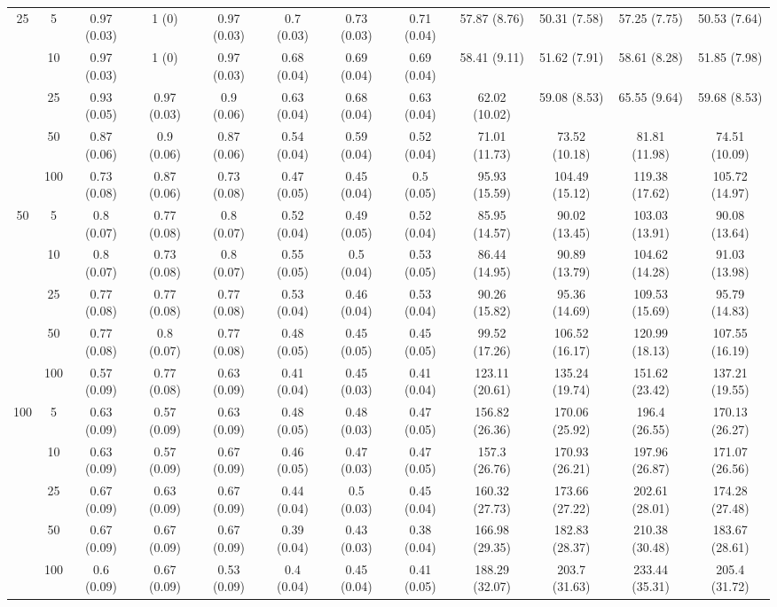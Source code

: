 \documentclass[10pt]{article}
\theoremstyle{definition}
\begin{document}
\begin{table}[H]
\begin{center}
{\begin{tabular}{cc|ccc|ccc|cccc|}
 \multirow{5}{*}{25} & 5  & 0.97 (0.03) & 1 (0) & 0.97 (0.03) & 0.7 (0.03) & 0.73 (0.03) & 0.71 (0.04) & 57.87 (8.76) & 50.31 (7.58) & 57.25 (7.75) & 50.53 (7.64) \\ 
  & 10  & 0.97 (0.03) & 1 (0) & 0.97 (0.03) & 0.68 (0.04) & 0.69 (0.04) & 0.69 (0.04) & 58.41 (9.11) & 51.62 (7.91) & 58.61 (8.28) & 51.85 (7.98) \\ 
  & 25  & 0.93 (0.05) & 0.97 (0.03) & 0.9 (0.06) & 0.63 (0.04) & 0.68 (0.04) & 0.63 (0.04) & 62.02 (10.02) & 59.08 (8.53) & 65.55 (9.64) & 59.68 (8.53) \\ 
  & 50  & 0.87 (0.06) & 0.9 (0.06) & 0.87 (0.06) & 0.54 (0.04) & 0.59 (0.04) & 0.52 (0.04) & 71.01 (11.73) & 73.52 (10.18) & 81.81 (11.98) & 74.51 (10.09) \\ 
  & 100  & 0.73 (0.08) & 0.87 (0.06) & 0.73 (0.08) & 0.47 (0.05) & 0.45 (0.04) & 0.5 (0.05) & 95.93 (15.59) & 104.49 (15.12) & 119.38 (17.62) & 105.72 (14.97) \\[.3cm] 
 \multirow{5}{*}{50} & 5  & 0.8 (0.07) & 0.77 (0.08) & 0.8 (0.07) & 0.52 (0.04) & 0.49 (0.05) & 0.52 (0.04) & 85.95 (14.57) & 90.02 (13.45) & 103.03 (13.91) & 90.08 (13.64) \\ 
  & 10  & 0.8 (0.07) & 0.73 (0.08) & 0.8 (0.07) & 0.55 (0.05) & 0.5 (0.04) & 0.53 (0.05) & 86.44 (14.95) & 90.89 (13.79) & 104.62 (14.28) & 91.03 (13.98) \\ 
  & 25  & 0.77 (0.08) & 0.77 (0.08) & 0.77 (0.08) & 0.53 (0.04) & 0.46 (0.04) & 0.53 (0.04) & 90.26 (15.82) & 95.36 (14.69) & 109.53 (15.69) & 95.79 (14.83) \\ 
  & 50  & 0.77 (0.08) & 0.8 (0.07) & 0.77 (0.08) & 0.48 (0.05) & 0.45 (0.05) & 0.45 (0.05) & 99.52 (17.26) & 106.52 (16.17) & 120.99 (18.13) & 107.55 (16.19) \\ 
  & 100  & 0.57 (0.09) & 0.77 (0.08) & 0.63 (0.09) & 0.41 (0.04) & 0.45 (0.03) & 0.41 (0.04) & 123.11 (20.61) & 135.24 (19.74) & 151.62 (23.42) & 137.21 (19.55) \\[.3cm] 
 \multirow{5}{*}{100} & 5  & 0.63 (0.09) & 0.57 (0.09) & 0.63 (0.09) & 0.48 (0.05) & 0.48 (0.03) & 0.47 (0.05) & 156.82 (26.36) & 170.06 (25.92) & 196.4 (26.55) & 170.13 (26.27) \\ 
  & 10  & 0.63 (0.09) & 0.57 (0.09) & 0.67 (0.09) & 0.46 (0.05) & 0.47 (0.03) & 0.47 (0.05) & 157.3 (26.76) & 170.93 (26.21) & 197.96 (26.87) & 171.07 (26.56) \\ 
  & 25  & 0.67 (0.09) & 0.63 (0.09) & 0.67 (0.09) & 0.44 (0.04) & 0.5 (0.03) & 0.45 (0.04) & 160.32 (27.73) & 173.66 (27.22) & 202.61 (28.01) & 174.28 (27.48) \\ 
  & 50  & 0.67 (0.09) & 0.67 (0.09) & 0.67 (0.09) & 0.39 (0.04) & 0.43 (0.03) & 0.38 (0.04) & 166.98 (29.35) & 182.83 (28.37) & 210.38 (30.48) & 183.67 (28.61) \\ 
  & 100  & 0.6 (0.09) & 0.67 (0.09) & 0.53 (0.09) & 0.4 (0.04) & 0.45 (0.04) & 0.41 (0.05) & 188.29 (32.07) & 203.7 (31.63) & 233.44 (35.31) & 205.4 (31.72) \\
\end{tabular}}
   \end{center}
      \vspace{-.5cm}
\end{table}
\end{document}
